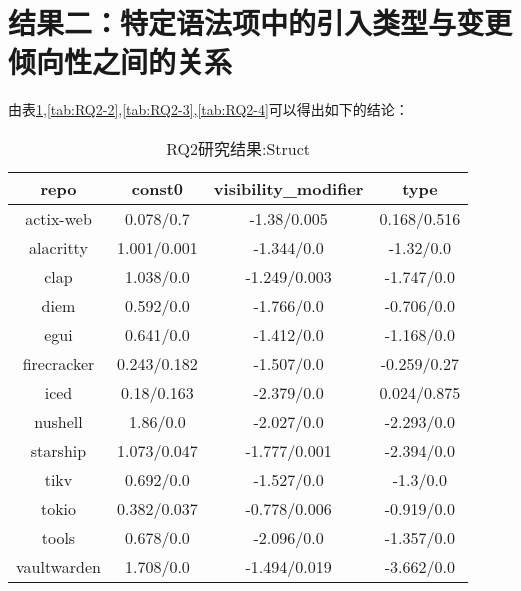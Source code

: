\section{结果二：特定语法项中的引入类型与变更倾向性之间的关系}
由表\ref{tab:RQ2-1},\ref{tab:RQ2-2},\ref{tab:RQ2-3},\ref{tab:RQ2-4}可以得出如下的结论：

\begin{table}[ht]
	\centering
        \caption{RQ2研究结果:Struct}
	\begin{tabular}{cccc}
        \toprule
		\textbf{repo}        & \textbf{const0}      & \textbf{visibility\_modifier} & \textbf{type}        \\
        \midrule
		actix-web   & \cellcolor{gray!20}0.078/0.7   & \cellcolor{orange!30}-1.38/0.005         & \cellcolor{gray!20}0.168/0.516 \\
		alacritty   & \cellcolor{green!20}1.001/0.001 & \cellcolor{orange!30}-1.344/0.0          & \cellcolor{orange!30}-1.32/0.0   \\
		clap        & \cellcolor{green!20}1.038/0.0   & \cellcolor{orange!30}-1.249/0.003        & \cellcolor{orange!30}-1.747/0.0  \\
		diem        & \cellcolor{green!20}0.592/0.0   & \cellcolor{orange!30}-1.766/0.0          & \cellcolor{orange!30}-0.706/0.0  \\
		egui        & \cellcolor{green!20}0.641/0.0   & \cellcolor{orange!30}-1.412/0.0          & \cellcolor{orange!30}-1.168/0.0  \\
		firecracker & \cellcolor{gray!20}0.243/0.182 & \cellcolor{orange!30}-1.507/0.0          & \cellcolor{gray!20}-0.259/0.27 \\
		iced        & \cellcolor{gray!20}0.18/0.163  & \cellcolor{orange!30}-2.379/0.0          & \cellcolor{gray!20}0.024/0.875 \\
		nushell     & \cellcolor{green!20}1.86/0.0    & \cellcolor{orange!30}-2.027/0.0          & \cellcolor{orange!30}-2.293/0.0  \\
		starship    & \cellcolor{green!20}1.073/0.047 & \cellcolor{orange!30}-1.777/0.001        & \cellcolor{orange!30}-2.394/0.0  \\
		tikv        & \cellcolor{green!20}0.692/0.0   & \cellcolor{orange!30}-1.527/0.0          & \cellcolor{orange!30}-1.3/0.0    \\
		tokio       & \cellcolor{green!20}0.382/0.037 & \cellcolor{orange!30}-0.778/0.006        & \cellcolor{orange!30}-0.919/0.0  \\
		tools       & \cellcolor{green!20}0.678/0.0   & \cellcolor{orange!30}-2.096/0.0          & \cellcolor{orange!30}-1.357/0.0  \\
		vaultwarden & \cellcolor{green!20}1.708/0.0   & \cellcolor{orange!30}-1.494/0.019        & \cellcolor{orange!30}-3.662/0.0   \\
        \bottomrule 
	\end{tabular}
	\label{tab:RQ2-1}
\end{table}

